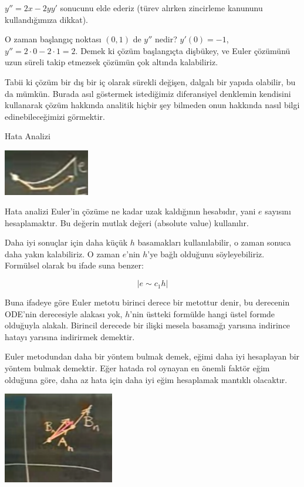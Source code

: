 \documentclass[12pt,fleqn]{article}\usepackage{../../common}
\begin{document}
$y'' = 2x - 2yy'$ sonucunu elde ederiz (türev alırken zincirleme kanununu
kullandığımıza dikkat).

O zaman başlangıç noktası $(0,1)$ de $y''$ nedir? $y'(0) = -1$, $y''= 2 \cdot 0
- 2\cdot 1 = 2$. Demek ki çözüm başlangıçta dişbükey, ve Euler çözümünü
uzun süreli takip etmezsek çözümün çok altında kalabiliriz. 

Tabii ki çözüm bir dış bir iç olarak sürekli değişen, dalgalı bir yapıda
olabilir, bu da mümkün. Burada asıl göstermek istediğimiz diferansiyel denklemin
kendisini kullanarak çözüm hakkında analitik hiçbir şey bilmeden onun hakkında
nasıl bilgi edinebileceğimizi görmektir. 

Hata Analizi

\includegraphics[height=2cm]{2_3.png}

Hata analizi Euler'in çözüme ne kadar uzak kaldığının hesabıdır, yani $e$
sayısını hesaplamaktır. Bu değerin mutlak değeri (absolute value) kullanılır. 

Daha iyi sonuçlar için daha küçük $h$ basamakları kullanılabilir, o zaman sonuca
daha yakın kalabiliriz. O zaman $e$'nin $h$'ye bağlı olduğunu
söyleyebiliriz. Formülsel olarak bu ifade suna benzer:

$$
|e \sim c_1 h|
$$

Buna ifadeye göre Euler metotu birinci derece bir metottur denir, bu derecenin
ODE'nin derecesiyle alakası yok, $h$'nin üstteki formülde hangi üstel formde
olduğuyla alakalı. Birincil derecede bir ilişki mesela basamağı yarısına
indirince hatayı yarısına indirirmek demektir.

Euler metodundan daha bir yöntem bulmak demek, eğimi daha iyi hesaplayan bir
yöntem bulmak demektir. Eğer hatada rol oynayan en önemli faktör eğim olduğuna
göre, daha az hata için daha iyi eğim hesaplamak mantıklı olacaktır. 

\includegraphics[height=4cm]{2_4.png}
\end{document}
